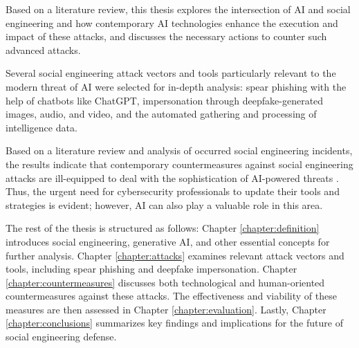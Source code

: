 Based on a literature review, this thesis explores the intersection of AI and social engineering and how contemporary AI technologies enhance the execution and impact of these attacks, and discusses the necessary actions to counter such advanced attacks. %

Several social engineering attack vectors and tools particularly relevant to the modern threat of AI were selected for in-depth analysis: spear phishing with the help of chatbots like ChatGPT, impersonation through deepfake-generated images, audio, and video, and the automated gathering and processing of intelligence data.




Based on a literature review and analysis of occurred social engineering incidents, the results indicate that contemporary countermeasures against social engineering attacks are ill-equipped to deal with the sophistication of AI-powered threats \citep{fakhouriAIDrivenSolutionsForSocialEngineeringAttacks2024}. Thus, the urgent need for cybersecurity professionals to update their tools and strategies is evident; however, AI can also play a valuable role in this area.





%
%

The rest of the thesis is structured as follows: Chapter \ref{chapter:definition} introduces social engineering, generative AI, and other essential concepts for further analysis. Chapter \ref{chapter:attacks} examines relevant attack vectors and tools, including spear phishing and deepfake impersonation. Chapter \ref{chapter:countermeasures} discusses both technological and human-oriented countermeasures against these attacks. The effectiveness and viability of these measures are then assessed in Chapter \ref{chapter:evaluation}. Lastly, Chapter \ref{chapter:conclusions} summarizes key findings and implications for the future of social engineering defense.




